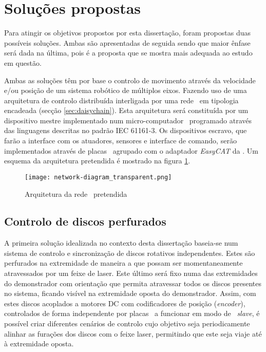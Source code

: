 \section{Soluções propostas} \label{sec:solution}

Para atingir os objetivos propostos por esta dissertação, foram propostas 
duas possíveis soluções. Ambas são apresentadas de seguida sendo que
maior ênfase será dada na última, pois é a proposta que se mostra mais
adequada ao estudo em questão.

Ambas as soluções têm por base o controlo de movimento através da velocidade
e/ou posição de um sistema robótico de múltiplos eixos. Fazendo uso de
uma arquitetura de controlo distribuída interligada por uma rede \ecat\
em tipologia encadeada (secção \ref{sec:daisychain}). Esta arquitetura
será constituída por um dispositivo mestre implementado num micro-computador
\raspi\, programado através das linguagens descritas no padrão
IEC 61161-3. Os dispositivos escravo, que farão a interface com os atuadores,
sensores e interface de comando, serão implementados através de placas
\arduino\ agrupado com o adaptador \emph{EasyCAT} da \cite{ABT:EasyCAT}.
Um esquema da arquitetura pretendida é mostrado na figura
\ref{fig:network-architecture}.

\begin{figure}
 \centering
 \texttt{[image: network-diagram\_transparent.png]}
 \caption{Arquitetura da rede \ecat\ pretendida}
 \label{fig:network-architecture}
\end{figure}



\subsection{Controlo de discos perfurados}\label{sec:discs_project}

A primeira solução idealizada no contexto desta dissertação baseia-se num
sistema de controlo e sincronização de discos rotativos independentes.
Estes são perfurados na extremidade de maneira a que possam ser momentaneamente atravessados por um feixe de laser. Este último será fixo numa das extremidades
do demonstrador com orientação que permita atravessar todos os discos presentes
no sistema, ficando visível na extremidade oposta do demonstrador. Assim,
com estes discos acoplados a motores DC com codificadores de posição (\emph{encoder}),
controlados de forma independente por placas \arduino\ a funcionar em modo
de \ecat\ \emph{slave}, é possível criar diferentes cenários de controlo
cujo objetivo seja periodicamente alinhar as furações dos discos com o
feixe laser, permitindo que este seja viaje até à extremidade oposta.

